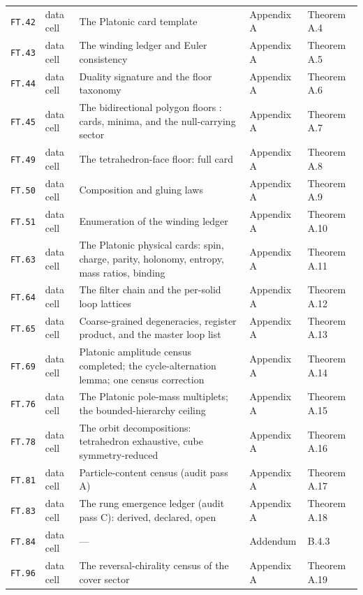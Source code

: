 \begin{longtable}{@{}p{}p{}p{}p{}p{}@{}}
\texttt{FT{.}42} & data cell & The Platonic card template & Appendix A & Theorem A.4 \\
\texttt{FT{.}43} & data cell & The winding ledger and Euler consistency & Appendix A & Theorem A.5 \\
\texttt{FT{.}44} & data cell & Duality signature and the floor taxonomy & Appendix A & Theorem A.6 \\
\texttt{FT{.}45} & data cell & The bidirectional polygon floors : cards, minima, and the null-carrying sector & Appendix A & Theorem A.7 \\
\texttt{FT{.}49} & data cell & The tetrahedron-face floor: full card & Appendix A & Theorem A.8 \\
\texttt{FT{.}50} & data cell & Composition and gluing laws & Appendix A & Theorem A.9 \\
\texttt{FT{.}51} & data cell & Enumeration of the winding ledger & Appendix A & Theorem A.10 \\
\texttt{FT{.}63} & data cell & The Platonic physical cards: spin, charge, parity, holonomy, entropy, mass ratios, binding & Appendix A & Theorem A.11 \\
\texttt{FT{.}64} & data cell & The filter chain and the per-solid loop lattices & Appendix A & Theorem A.12 \\
\texttt{FT{.}65} & data cell & Coarse-grained degeneracies, register product, and the master loop list & Appendix A & Theorem A.13 \\
\texttt{FT{.}69} & data cell & Platonic amplitude census completed; the cycle-alternation lemma; one census correction & Appendix A & Theorem A.14 \\
\texttt{FT{.}76} & data cell & The Platonic pole-mass multiplets; the bounded-hierarchy ceiling & Appendix A & Theorem A.15 \\
\texttt{FT{.}78} & data cell & The orbit decompositions: tetrahedron exhaustive, cube symmetry-reduced & Appendix A & Theorem A.16 \\
\texttt{FT{.}81} & data cell & Particle-content census (audit pass A) & Appendix A & Theorem A.17 \\
\texttt{FT{.}83} & data cell & The rung emergence ledger (audit pass C): derived, declared, open & Appendix A & Theorem A.18 \\
\texttt{FT{.}84} & data cell & --- & Addendum & B.4.3 \\
\texttt{FT{.}96} & data cell & The reversal-chirality census of the cover sector & Appendix A & Theorem A.19 \\

\end{longtable}
